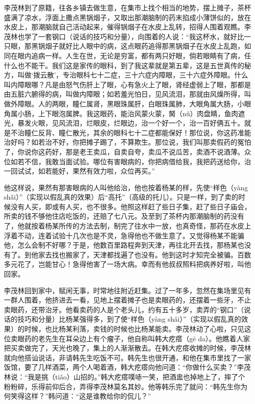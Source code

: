 \documentclass[12pt,UTF8]{ctexbook}
\begin{document}
李茂林到了原籍，往各乡镇去做生意，在集市上找个相当的地势，摆上摊子，茶杯盛满了凉水，浮面上撒点黑锅烟子，又取出那潮脑制的药末掐成小薄饼似的，放在水皮上，那潮脑就自己活动起来，催得锅烟子在水皮上乱转，招得人围着观瞧。李茂林也学了一套钢口（说话的技巧和分量），向围着的人说：“我这杯水，就好比一只眼，那黑锅烟子就好比人眼中的病，这点眼药追得那黑锅烟子在水皮上乱跑，如同在眼内追病一样。人生在世，无论是穷富，都有两只好眼，倘若眼睛有了病，任什么也不能干。我们这是家传的眼科，到了我这辈就是第五辈，这是五世真传的秘方，叫做‘拨云散’，专治眼科七十二症，三十六症内障眼，三十六症外障眼。什么叫内障眼哪？凡是由怒气伤肝上了眼，心有急火上了眼，肾经虚弱上了眼，那都是由五脏六腑得的病，叫做内障眼；如若羞光怕日，见风流泪，那就由风燥所得，叫做外障眼。人的两眼，瞳仁属肾，黑眼珠属肝，白眼珠属肺，大眼角属大肠，小眼角属小肠，上下眼泡属脾。我这眼药，能治风蒙火蒙，胬（nǔ）肉盘睛，鱼肉遮光，暴发火眼，见风流泪，烂眼皮，烂眼边，治一个好一个，治一百好俩五十。就是不治瞳仁反背、瞳仁散光，其余的眼科七十二症都能保好！那位说，你这药准能治好吗？如若治不好，你把摊子踢了，不算欺生。那位说，我们叫那卖假药的冤怕了，你说你这药好，那是老王卖瓜，自卖自夸，卖瓜不说瓜苦，卖酒不说酒薄。众位如若不信，我敢当面试验。哪位有害眼病的，你把病借给我，我把药送给你，治一回试试，如若能好，果然有效力啦，众位再买。”

他这样说，果然有那害眼病的人叫他给治，他也按着杨某的样，先使“样色（yàng shǎi）”（实现以假乱真的效果）后“高托”（高级的托儿）。只是一样，到了卖的时候没有人买，即或有人买，也不很多。他照这样赶了些日子集，赶了些日子庙会，所卖的钱不够他住店吃饭的，还赔了七八元。及至到了茶杯内那潮脑制的药没有了，他就按着杨某所传的方法去制，制完了往水中一放，也真奇怪，那药在水皮上浮着不动，连着试验十几次也是不灵，急得他也不做生意了。又觉得杨某不能骗他，怎么会制不好哪？于是，他数百里路程奔到天津，再往北开去找，那杨某也没有了。到他家去找也搬家了，天津都找遍了也没有。他到这时才知完全被骗。百数多元花了，岂能甘心！急得他害了一场大病。幸而有他叔叔照料把病养好啦，叫他回家。

李茂林回到家中，赋闲无事，时常地往附近赶集。过了一年多，忽然在集场里见有一群人围着，他挤进去一看，见地上摆着摊子也是卖眼药的，还摆着一些牙，不止卖眼药，还带治牙。他看卖药的人是个老头儿，约有五十多岁，卖弄的“钢口”（说话的技巧和分量）比杨某强得多，到了使“样色（yàng shǎi）”（实现以假乱真的效果）的时候，也比杨某利落，卖钱的时候也比杨某能卖。李茂林动了心啦，只见这位卖眼药的老先生在耳朵边上有个瘤子，他自称叫韩大疙瘩（gē da）。他瞧着人家把买卖做完了，天光也晚了，集上的人渐渐散去。在韩大疙瘩收摊的时候，李茂林就向他搭讪说话，非请韩先生吃饭不可。韩先生也很开通，和他在集市里找了一家饭馆，要了几样酒菜，两个人喝着酒，韩大疙瘩向他问道：“你做什么买卖？”李茂林说：“我是挑（tiǎo）山招的。”韩大疙瘩噗哧一笑，把酒盅也掉地上了，摔了个粉粉碎，乐得前仰后合，弄得李茂林莫名其妙。他等韩乐完了就问：“韩先生你为何笑得这样？”韩问道：“这是谁教给你的侃儿？”
\end{document}
